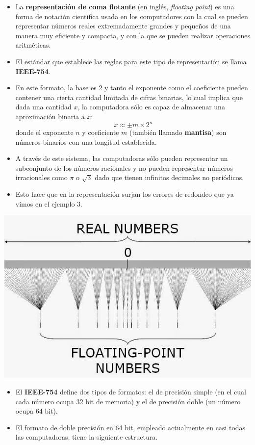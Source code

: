 \documentclass[openany]{book}
\providecommand{\tightlist}{%
  \setlength{\itemsep}{0pt}\setlength{\parskip}{0pt}}
\begin{document}
\begin{itemize}
\item
  La \textbf{representación de coma flotante} (en inglés, \emph{floating point}) es una forma de notación científica usada en los computadores con la cual se pueden representar números reales extremadamente grandes y pequeños de una manera muy eficiente y compacta, y con la que se pueden realizar operaciones aritméticas.
\item
  El estándar que establece las reglas para este tipo de representación se llama \textbf{IEEE-754}.
\item
  En este formato, la base es 2 y tanto el exponente como el coeficiente pueden contener una cierta cantidad limitada de cifras binarias, lo cual implica que dada una cantidad \(x\), la computadora sólo es capaz de almacenar una aproximación binaria a \(x\):
  \[x \approx \pm m \times 2^n\]
  donde el exponente \(n\) y coeficiente \(m\) (también llamado \textbf{mantisa}) son números binarios con una longitud establecida.
\item
  A través de este sistema, las computadoras sólo pueden representar un subconjunto de los números racionales y no pueden representar números irracionales como \(\pi\) o \(\sqrt3\) dado que tienen infinitos decimales no periódicos.
\item
  Esto hace que en la representación surjan los errores de redondeo que ya vimos en el ejemplo 3.
\end{itemize}

\begin{center}\includegraphics[width=0.5\linewidth]{Plots/U1/floatingPoint} \end{center}

\begin{itemize}
\tightlist
\item
  El \textbf{IEEE-754} define dos tipos de formatos: el de precisión simple (en el cual cada número ocupa 32 bit de memoria) y el de precisión doble (un número ocupa 64 bit).
\item
  El formato de doble precisión en 64 bit, empleado actualmente en casi todas las computadoras, tiene la siguiente estructura.
\end{itemize}
\end{document}
